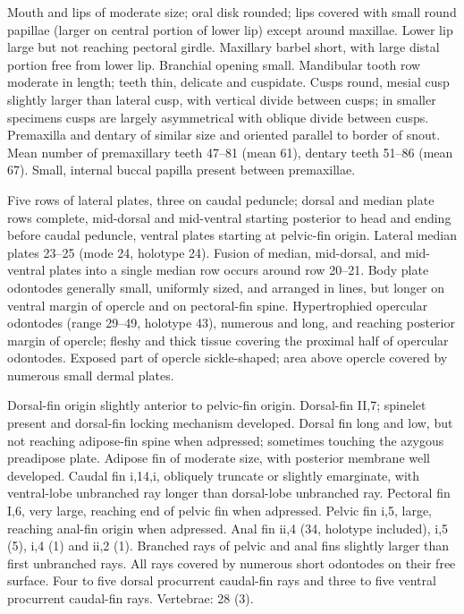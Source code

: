 \documentclass[12pt]{article}
\begin{document}
Mouth and lips of moderate size; oral disk rounded; lips covered with small round papillae (larger on central portion of lower lip) except around maxillae. %
Lower lip large but not reaching pectoral girdle. %
Maxillary barbel short, with large distal portion free from lower lip. %
Branchial opening small. %
Mandibular tooth row moderate in length; teeth thin, delicate and cuspidate. %
Cusps round, mesial cusp slightly larger than lateral cusp, with vertical divide between cusps; in smaller specimens cusps are largely asymmetrical with oblique divide between cusps. %
Premaxilla and dentary of similar size and oriented parallel to border of snout. %
Mean number of premaxillary teeth 47--81 (mean 61), dentary teeth 51--86 (mean 67).%
Small, internal buccal papilla present between premaxillae.%

Five rows of lateral plates, three on caudal peduncle; dorsal and median plate rows complete, mid-dorsal and mid-ventral starting posterior to head and ending before caudal peduncle, ventral plates starting at pelvic-fin origin. %
Lateral median plates 23--25 (mode 24, holotype 24). %
Fusion of median, mid-dorsal, and mid-ventral plates into a single median row occurs around row 20--21. %
Body plate odontodes generally small, uniformly sized, and arranged in lines, but longer on ventral margin of opercle and on pectoral-fin spine. %
Hypertrophied opercular odontodes (range 29--49, holotype 43), numerous and long, and reaching posterior margin of opercle; fleshy and thick tissue covering the proximal half of opercular odontodes. %
Exposed part of opercle sickle-shaped; area above opercle covered by numerous small dermal plates.%

Dorsal-fin origin slightly anterior to pelvic-fin origin. %
Dorsal-fin II,7; spinelet present and dorsal-fin locking mechanism developed. %
Dorsal fin long and low, but not reaching adipose-fin spine when adpressed; sometimes touching the azygous preadipose plate. %
Adipose fin of moderate size, with posterior membrane well developed. %
Caudal fin i,14,i, obliquely truncate or slightly emarginate, with ventral-lobe unbranched ray longer than dorsal-lobe unbranched ray. %
Pectoral fin I,6, very large, reaching end of pelvic fin when adpressed. %
Pelvic fin i,5, large, reaching anal-fin origin when adpressed. %
Anal fin ii,4 (34, holotype included), i,5 (5), i,4 (1) and ii,2 (1). %
Branched rays of pelvic and anal fins slightly larger than first unbranched rays. %
All rays covered by numerous short odontodes on their free surface. %
Four to five dorsal procurrent caudal-fin rays and three to five ventral procurrent caudal-fin rays. Vertebrae: 28 (3).\\%
\bigskip
\end{document}
